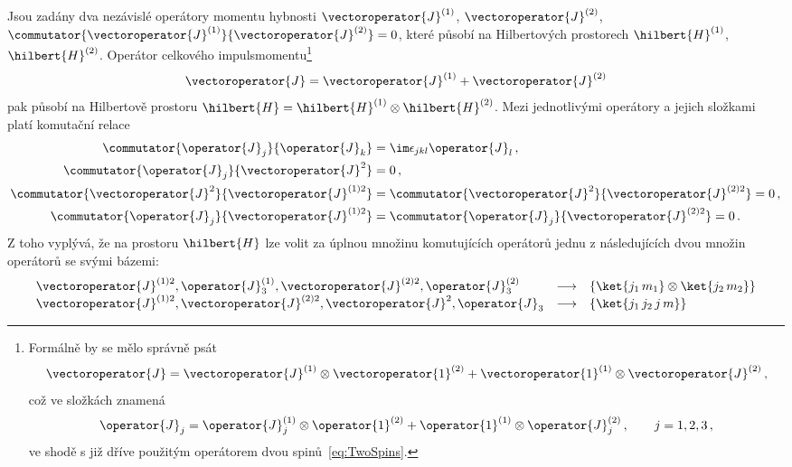 Jsou zadány dva nezávislé operátory momentu hybnosti $\vectoroperator{J}^{(1)}$, $\vectoroperator{J}^{(2)}$, $\commutator{\vectoroperator{J}^{(1)}}{\vectoroperator{J}^{(2)}}=0$, které působí na Hilbertových prostorech $\hilbert{H}^{(1)}$, $\hilbert{H}^{(2)}$.
Operátor celkového impulsmomentu\footnote{
    Formálně by se mělo správně psát
    \begin{equation}
        \vectoroperator{J}=\vectoroperator{J}^{(1)}\otimes\vectoroperator{1}^{(2)}+\vectoroperator{1}^{(1)}\otimes\vectoroperator{J}^{(2)}\,,
    \end{equation}
    což ve složkách znamená
    \begin{equation}
        \operator{J}_{j}=\operator{J}_{j}^{(1)}\otimes\operator{1}^{(2)}+\operator{1}^{(1)}\otimes\operator{J}_{j}^{(2)}\,,
        \qquad j=1,2,3\,,
    \end{equation}
    ve shodě s již dříve použitým operátorem dvou spinů~\eqref{eq:TwoSpins}.
}
\begin{equation}
    \vectoroperator{J}=\vectoroperator{J}^{(1)}+\vectoroperator{J}^{(2)}
\end{equation}
pak působí na Hilbertově prostoru $\hilbert{H}=\hilbert{H}^{(1)}\otimes\hilbert{H}^{(2)}$.
Mezi jednotlivými operátory a jejich složkami platí komutační relace
\begin{subequations}
    \begin{align}
        \commutator{\operator{J}_{j}}{\operator{J}_{k}}
            &=\im\epsilon_{jkl}\operator{J}_{l}\,,\\
        \commutator{\operator{J}_{j}}{\vectoroperator{J}^{2}}
            &=0\,,\\
        \commutator{\vectoroperator{J}^{2}}{\vectoroperator{J}^{(1)2}}
            &=\commutator{\vectoroperator{J}^{2}}{\vectoroperator{J}^{(2)2}}=0\,,\\
        \commutator{\operator{J}_{j}}{\vectoroperator{J}^{(1)2}}
            &=\commutator{\operator{J}_{j}}{\vectoroperator{J}^{(2)2}}=0\,.
    \end{align}
\end{subequations}
Z toho vyplývá, že na prostoru $\hilbert{H}$ lze volit za úplnou množinu komutujících operátorů jednu z následujících dvou množin operátorů se svými bázemi:
\begin{equation}
    \begin{array}{lcl}
        \vectoroperator{J}^{(1)2},\operator{J}^{(1)}_{3},\vectoroperator{J}^{(2)2},\operator{J}^{(2)}_{3} 
            & \longrightarrow 
            & \{\ket{j_{1}\,m_{1}}\otimes\ket{j_{2}\,m_{2}}\}\\
        \vectoroperator{J}^{(1)2},\vectoroperator{J}^{(2)2},\vectoroperator{J}^{2},\operator{J}_{3} 
            & \longrightarrow 
            & \{\ket{j_{1}\,j_{2}\,j\,m}\}
    \end{array}
\end{equation}
